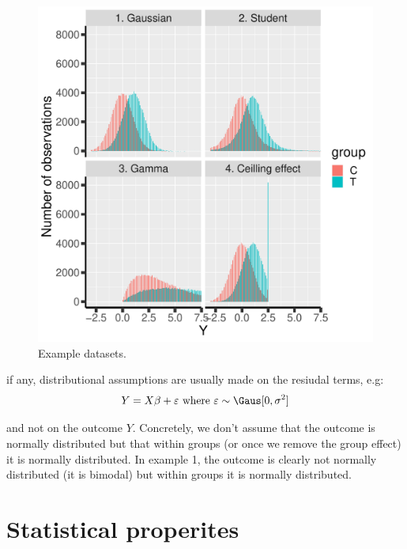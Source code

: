 \documentclass[12pt]{article}
\newcommand\Warning[1][3ex]{%
\renewcommand\stacktype{L}%
\scaleto{\stackon[1.3pt]{\color{red}$\triangle$}{\tiny\bfseries !}}{#1}%
\xspace
}
\begin{document}
\begin{figure}[!h]
\centering
\includegraphics[width=\textwidth]{./figures/examples-hist.pdf}
\caption{\label{fig:examples}Example datasets.}
\end{figure}

\Warning if any, distributional assumptions are usually made on the resiudal terms, e.g:
\begin{align*}
Y = X \beta + \varepsilon \text{ where } \varepsilon \sim \Gaus[0,\sigma^2]
\end{align*}


and not on the outcome \(Y\). Concretely, we don't assume that the
outcome is normally distributed but that within groups (or once we
remove the group effect) it is normally distributed. In example 1, the
outcome is clearly not normally distributed (it is bimodal) but within
groups it is normally distributed.

\vfill

\clearpage

\section{Statistical properites}
\label{sec:orgb4dfed2}
\end{document}
